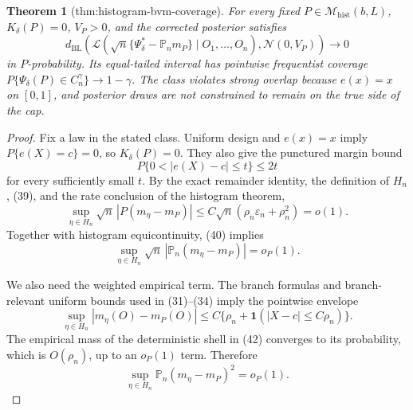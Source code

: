 \documentclass{article}
\newtheorem{theorem}{Theorem}
\begin{document}
\begin{theorem}[thm:histogram-bvm-coverage]\label{thm:histogram-bvm-coverage}
For every fixed \(P\in\mathcal M_{\mathrm{hist}}(b,L)\), \(K_\delta(P)=0\), \(V_P>0\), and the corrected posterior satisfies \[d_{\mathrm{BL}}\!\left(\mathcal L\!\left(\sqrt n\{\Psi_\delta^*-\mathbb P_nm_P\}\mid O_1,\ldots,O_n\right),\mathcal N(0,V_P)\right)\to0\] in \(P\)-probability. Its equal-tailed interval has pointwise frequentist coverage \(P\{\Psi_\delta(P)\in C_n^\gamma\}\to1-\gamma\). The class violates strong overlap because \(e(x)=x\) on \([0,1]\), and posterior draws are not constrained to remain on the true side of the cap.
\end{theorem}
\begin{proof}
Fix a law in the stated class.  Uniform design and \(e(x)=x\) imply
\(P\{e(X)=c\}=0\), so \(K_\delta(P)=0\).  They also give the punctured margin bound
\begin{equation}
 P\{0<|e(X)-c|\le t\}\le2t                                                            \tag{39}
\end{equation}
for every sufficiently small \(t\).  By the exact remainder identity, the definition of \(H_n\), (39), and the rate conclusion of the histogram theorem,
\begin{equation}
 \sup_{\eta\in H_n}\sqrt n\,|P(m_\eta-m_P)|
 \le C\sqrt n(\rho_n\varepsilon_n+\rho_n^2)=o(1).                                     \tag{40}
\end{equation}
Together with histogram equicontinuity, (40) implies
\begin{equation}
 \sup_{\eta\in H_n}\sqrt n\,|\mathbb P_n(m_\eta-m_P)|=o_P(1).                       \tag{41}
\end{equation}

We also need the weighted empirical term.  The branch formulas and branch-relevant uniform bounds used in (31)--(34) imply the pointwise envelope
\begin{equation}
 \sup_{\eta\in H_n}|m_\eta(O)-m_P(O)|
 \le C\{\rho_n+\mathbf1(|X-c|\le C\rho_n)\}.                                          \tag{42}
\end{equation}
The empirical mass of the deterministic shell in (42) converges to its probability, which is \(O(\rho_n)\), up to an \(o_P(1)\) term.  Therefore
\begin{equation}
 \sup_{\eta\in H_n}\mathbb P_n(m_\eta-m_P)^2=o_P(1).                                 \tag{43}
\end{equation}


\end{proof}
\end{document}
